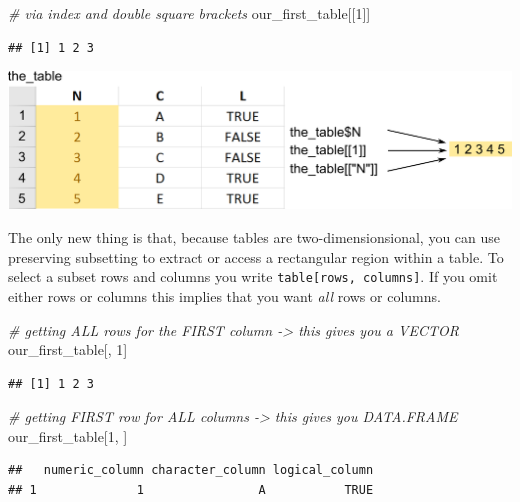 \documentclass[
]{book}
\newenvironment{Shaded}{\begin{snugshade}}{\end{snugshade}}
\newcommand{\CommentTok}[1]{\textcolor[rgb]{0.56,0.35,0.01}{\textit{#1}}}
\newcommand{\DecValTok}[1]{\textcolor[rgb]{0.00,0.00,0.81}{#1}}
\newcommand{\NormalTok}[1]{#1}
\begin{document}
\begin{Shaded}
\begin{Highlighting}[]
\CommentTok{\# via index and double square brackets}
\NormalTok{our\_first\_table[[}\DecValTok{1}\NormalTok{]]}
\end{Highlighting}
\end{Shaded}

\begin{verbatim}
## [1] 1 2 3
\end{verbatim}

\begin{center}\includegraphics[width=1\linewidth]{images/table-column} \end{center}

The only new thing is that, because tables are two-dimensionsional, you can use preserving subsetting to extract or access a rectangular region within a table. To select a subset rows and columns you write \texttt{table{[}rows,\ columns{]}}. If you omit either rows or columns this implies that you want \emph{all} rows or columns.

\begin{Shaded}
\begin{Highlighting}[]
\CommentTok{\# getting ALL rows for the FIRST column {-}\textgreater{} this gives you a VECTOR}
\NormalTok{our\_first\_table[, }\DecValTok{1}\NormalTok{]}
\end{Highlighting}
\end{Shaded}

\begin{verbatim}
## [1] 1 2 3
\end{verbatim}

\begin{Shaded}
\begin{Highlighting}[]
\CommentTok{\# getting FIRST row for ALL columns {-}\textgreater{} this gives you DATA.FRAME}
\NormalTok{our\_first\_table[}\DecValTok{1}\NormalTok{, ]}
\end{Highlighting}
\end{Shaded}

\begin{verbatim}
##   numeric_column character_column logical_column
## 1              1                A           TRUE
\end{verbatim}
\end{document}
